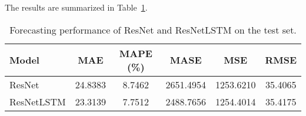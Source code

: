\documentclass[12pt]{article}
\begin{document}
The results are summarized in Table~\ref{tab:results}.

\begin{table}[ht]
\centering
\caption{Forecasting performance of ResNet and ResNetLSTM on the test set.}
\label{tab:results}
\begin{tabular}{lccccc}
\toprule
Model & MAE & MAPE (\%) & MASE & MSE & RMSE \\
\midrule
ResNet & 24.8383 & 8.7462 & 2651.4954 & 1253.6210 & 35.4065 \\
ResNetLSTM & 23.3139 & 7.7512 & 2488.7656 & 1254.4014 & 35.4175 \\
\bottomrule
\end{tabular}
\end{table}



\end{document}
